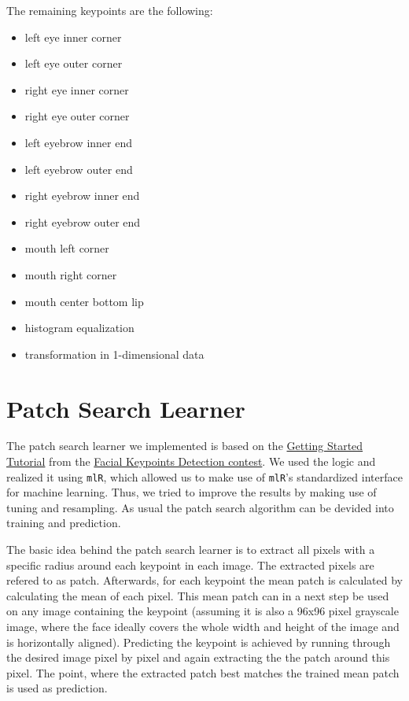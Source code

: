 \documentclass[]{article}
\begin{document}
The remaining keypoints are the following:

\begin{itemize}
\item
  left eye inner corner
\item
  left eye outer corner
\item
  right eye inner corner
\item
  right eye outer corner
\item
  left eyebrow inner end
\item
  left eyebrow outer end
\item
  right eyebrow inner end
\item
  right eyebrow outer end
\item
  mouth left corner
\item
  mouth right corner
\item
  mouth center bottom lip
\item
  histogram equalization
\item
  transformation in 1-dimensional data
\end{itemize}

\section{Patch Search Learner}\label{patch-search-learner}

The patch search learner we implemented is based on the
\href{https://www.kaggle.com/c/facial-keypoints-detection/details/getting-started-with-r}{Getting
Started Tutorial} from the
\href{https://www.kaggle.com/c/facial-keypoints-detection}{Facial
Keypoints Detection contest}. We used the logic and realized it using
\texttt{mlR}, which allowed us to make use of \texttt{mlR}'s
standardized interface for machine learning. Thus, we tried to improve
the results by making use of tuning and resampling. As usual the patch
search algorithm can be devided into training and prediction.

The basic idea behind the patch search learner is to extract all pixels
with a specific radius around each keypoint in each image. The extracted
pixels are refered to as patch. Afterwards, for each keypoint the mean
patch is calculated by calculating the mean of each pixel. This mean
patch can in a next step be used on any image containing the keypoint
(assuming it is also a 96x96 pixel grayscale image, where the face
ideally covers the whole width and height of the image and is
horizontally aligned). Predicting the keypoint is achieved by running
through the desired image pixel by pixel and again extracting the the
patch around this pixel. The point, where the extracted patch best
matches the trained mean patch is used as prediction.
\end{document}

